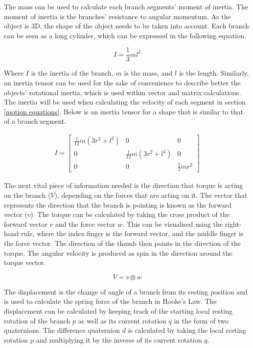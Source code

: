 \noindent
The mass can be used to calculate each branch segments' moment of inertia. The moment of inertia is the branches' resistance to angular momentum. As the object is 3D, the shape of the object needs to be taken into account. Each branch can be seen as a long cylinder, which can be expressed in the following equation.

\begin{equation}
I = \frac{1}{3} m l ^ 2
\end{equation}

\noindent
Where $I$ is the inertia of the branch, $m$ is the mass, and $l$ is the length. Similarly, an inertia tensor can be used for the sake of convenience to describe better the objects' rotational inertia, which is used within vector and matrix calculations. The inertia will be used when calculating the velocity of each segment in section \ref{motion equations}. Below is an inertia tensor for a shape that is similar to that of a branch segment.


\begin{equation}
\begin{aligned}
I = \begin{bmatrix}
\frac{1}{12}m(3r^2 + l^2) 	& 0 							& 0 \\
0 							& \frac{1}{12}m(3r^2 + l^2)		& 0 \\
0 							& 0 							& \frac{1}{2}mr^2 
\end{bmatrix}
\end{aligned}
\end{equation}

\noindent
The next vital piece of information needed is the direction that torque is acting on the branch ($V$), depending on the forces that are acting on it. The vector that represents the direction that the branch is pointing is known as the forward vector ($v$). The torque can be calculated by taking the cross product of the forward vector $v$ and the force vector $w$. This can be visualised using the right-hand rule, where the index finger is the forward vector, and the middle finger is the force vector. The direction of the thumb then points in the direction of the torque. The angular velocity is produced as spin in the direction around the torque vector.

\begin{equation}
V = v \otimes w
\end{equation}

\noindent
The displacement is the change of angle of a branch from its resting position and is used to calculate the spring force of the branch in Hooke's Law. The displacement can be calculated by keeping track of the starting local resting rotation of the branch $p$ as well as its current rotation $q$ in the form of two quaternions. The difference quaternion $d$ is calculated by taking the local resting rotation $p$ and multiplying it by the inverse of its current rotation $q$. 

